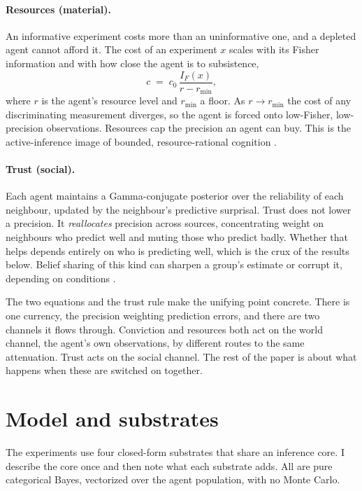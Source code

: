 \documentclass[11pt]{article}
\begin{document}
\paragraph{Resources (material).} An informative experiment costs more than an
uninformative one, and a depleted agent cannot afford it. The cost of an
experiment $x$ scales with its Fisher information and with how close the agent
is to subsistence,
\[
c \;=\; c_0\,\frac{I_F(x)}{r - r_{\min}},
\]
where $r$ is the agent's resource level and $r_{\min}$ a floor. As $r \to
r_{\min}$ the cost of any discriminating measurement diverges, so the agent is
forced onto low-Fisher, low-precision observations. Resources cap the precision
an agent can buy. This is the active-inference image of bounded, resource-rational
cognition \citep{liederGriffiths2020ResourceRational}.

\paragraph{Trust (social).} Each agent maintains a Gamma-conjugate posterior
over the reliability of each neighbour, updated by the neighbour's predictive
surprisal. Trust does not lower a precision. It \emph{reallocates} precision
across sources, concentrating weight on neighbours who predict well and muting
those who predict badly. Whether that helps depends entirely on who is
predicting well, which is the crux of the results below. Belief sharing of this
kind can sharpen a group's estimate or corrupt it, depending on conditions
\citep{friston2023Federated,catal2024BeliefSharing}.

The two equations and the trust rule make the unifying point concrete. There is
one currency, the precision weighting prediction errors, and there are two
channels it flows through. Conviction and resources both act on the world
channel, the agent's own observations, by different routes to the same
attenuation. Trust acts on the social channel. The rest of the paper is about
what happens when these are switched on together.

\section{Model and substrates}
\label{sec:model}

The experiments use four closed-form substrates that share an inference core. I
describe the core once and then note what each substrate adds. All are pure
categorical Bayes, vectorized over the agent population, with no Monte Carlo.
\end{document}
